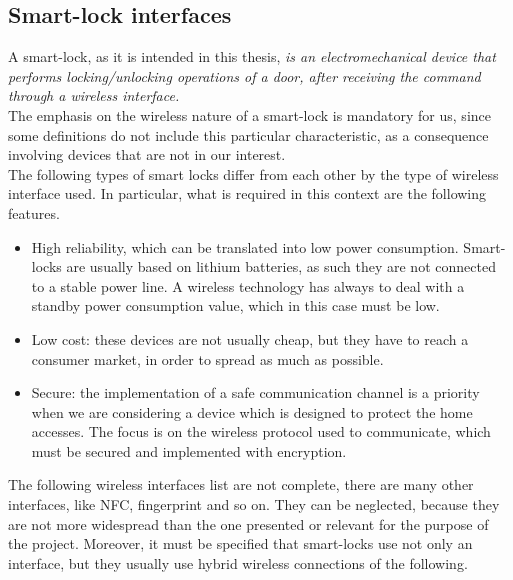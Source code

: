 \subsection{Smart-lock interfaces}
A smart-lock, as it is intended in this thesis, \emph{is an electromechanical device that performs locking/unlocking operations of a door, after receiving the command through a wireless interface.} \\
The emphasis on the wireless nature of a smart-lock is mandatory for us, since some definitions do not include this particular characteristic, as a consequence involving devices that are not in our interest. 
\\ The following types of smart locks differ from each other by the type of wireless interface used.
In particular, what is required in this context are the following features.
\begin{itemize}
    \item High reliability, which can be translated into low power consumption. Smart-locks are usually based on lithium batteries, as such they are not connected to a stable power line. A wireless technology has always to deal with a standby power consumption value, which in this case must be low.
    \item Low cost: these devices are not usually cheap, but they have to reach a consumer market, in order to spread as much as possible. 
    \item Secure: the implementation of a safe communication channel is a priority when we are considering a device which is designed to protect the home accesses. The focus is on the wireless protocol used to communicate, which must be secured and implemented with encryption.
\end{itemize}
The following wireless interfaces list are not complete, there are many other interfaces, like NFC, fingerprint and so on. They can be neglected, because they are not more widespread than the one presented or relevant for the purpose of the project. Moreover, it must be specified that smart-locks use not only an interface, but they usually use hybrid wireless connections of the following.
